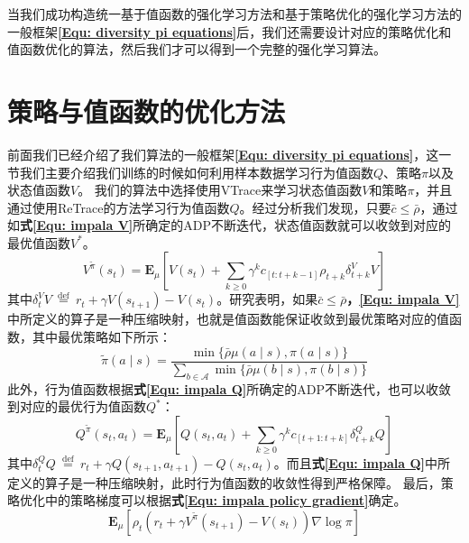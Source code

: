 当我们成功构造统一基于值函数的强化学习方法和基于策略优化的强化学习方法的一般框架\textbf{\eqref{Equ: diversity pi equations}}后，我们还需要设计对应的策略优化和值函数优化的算法，然后我们才可以得到一个完整的强化学习算法。

\section{策略与值函数的优化方法}
前面我们已经介绍了我们算法的一般框架\textbf{\eqref{Equ: diversity pi equations}}，这一节我们主要介绍我们训练的时候如何利用样本数据学习行为值函数$Q$、策略$\pi$以及状态值函数$V$。
我们的算法中选择使用VTrace来学习状态值函数$V$和策略$\pi$，并且通过使用ReTrace的方法学习行为值函数$Q$。经过分析我们发现，只要$\bar{c} \leq \bar{\rho}$，通过如\textbf{式\eqref{Equ: impala V}}所确定的ADP不断迭代，状态值函数就可以收敛到对应的最优值函数$V^*$。
\begin{equation}
\label{Equ: impala V}
    V^{\tilde{\pi}}\left(s_{t}\right)=\mathbf{E}_{\mu}\left[V\left(s_{t}\right)+\sum_{k \geq 0} \gamma^{k} c_{[t: t+k-1]} \rho_{t+k} \delta_{t+k}^{V} V\right]
\end{equation}
其中$\delta_{t}^{V} V \stackrel{\text { def }}{=} r_{t}+\gamma V\left(s_{t+1}\right)-V\left(s_{t}\right)$。研究表明，如果$\bar{c} \leq \bar{\rho}$\textbf{，\eqref{Equ: impala V}}中所定义的算子是一种压缩映射，也就是值函数能保证收敛到最优策略对应的值函数，其中最优策略如下所示：
\begin{equation}
    \tilde{\pi}(a \mid s)=\frac{\min \{\bar{\rho} \mu(a \mid s), \pi(a \mid s)\}}{\sum_{b \in \mathcal{A}} \min \{\bar{\rho} \mu(b \mid s), \pi(b \mid s)\}}
\end{equation}
此外，行为值函数根据\textbf{式\eqref{Equ: impala Q}}所确定的ADP不断迭代，也可以收敛到对应的最优行为值函数$Q^*$：
\begin{equation}
\label{Equ: impala Q}
    Q^{\tilde{\pi}}\left(s_{t}, a_{t}\right)=\mathbf{E}_{\mu}\left[Q\left(s_{t}, a_{t}\right)+\sum_{k \geq 0} \gamma^{k} c_{[t+1: t+k]} \delta_{t+k}^{Q} Q\right]
\end{equation}
其中$\delta_{t}^{Q} Q \stackrel{\text { def }}{=} r_{t}+\gamma Q\left(s_{t+1}, a_{t+1}\right)-Q\left(s_{t}, a_{t}\right)$。而且\textbf{式\eqref{Equ: impala Q}}中所定义的算子是一种压缩映射，此时行为值函数的收敛性得到严格保障。
最后，策略优化中的策略梯度可以根据\textbf{式\eqref{Equ: impala policy gradient}}确定。
\begin{equation}
\label{Equ: impala policy gradient}
    \mathbf{E}_{\mu}\left[\rho_{t}\left(r_{t}+\gamma V^{\tilde{\pi}}\left(s_{t+1}\right)-V\left(s_{t}\right)\right) \nabla \log \pi\right]
\end{equation}


